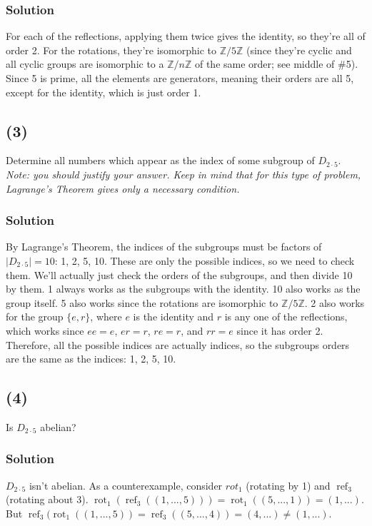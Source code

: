 \documentclass[fleqn]{article}
\DeclareMathOperator{\rot}{rot}
\DeclareMathOperator{\refl}{ref}
\begin{document}
            \subsubsection{Solution}
            For each of the reflections, applying them twice gives the identity, so they're all of order 2.  For the rotations, they're isomorphic to $\mathbb{Z}/5\mathbb{Z}$ (since they're cyclic and all cyclic groups are isomorphic to a $\mathbb{Z}/n\mathbb{Z}$ of the same order; see middle of \#5).  Since 5 is prime, all the elements are generators, meaning their orders are all 5, except for the identity, which is just order 1.
        
        \subsection{(3)}
        Determine all numbers which appear as the index of some subgroup of $D_{2 \cdot 5}$.  \textit{Note: you should justify your answer.  Keep in mind that for this type of problem, Lagrange's Theorem gives only a necessary condition.}
            
            \subsubsection{Solution}
            By Lagrange's Theorem, the indices of the subgroups must be factors of $|D_{2 \cdot 5}| = 10$: 1, 2, 5, 10.  These are only the possible indices, so we need to check them.  We'll actually just check the orders of the subgroups, and then divide 10 by them.  1 always works as the subgroups with the identity.  10 also works as the group itself.  5 also works since the rotations are isomorphic to $\mathbb{Z}/5\mathbb{Z}$.  2 also works for the group $\{e, r\}$, where $e$ is the identity and $r$ is any one of the reflections, which works since $ee = e$, $er = r$, $re = r$, and $rr = e$ since it has order 2.  Therefore, all the possible indices are actually indices, so the subgroups orders are the same as the indices: 1, 2, 5, 10.
        
        \subsection{(4)}
        Is $D_{2 \cdot 5}$ abelian?
            
            \subsubsection{Solution}
            $D_{2 \cdot 5}$ isn't abelian.  As a counterexample, consider $rot_1$ (rotating by 1) and $\refl_3$ (rotating about 3).  $\rot_1(\refl_3((1, ..., 5))) = \rot_1((5, ..., 1)) = (1, ...)$.  But $\refl_3(\rot_1((1, ..., 5)) = \refl_3((5, ..., 4)) = (4, ...) \neq (1, ...)$.
            
\end{document}
